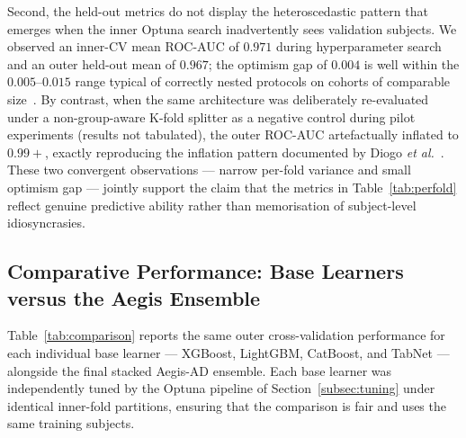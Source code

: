 Second, the held-out metrics do not display the heteroscedastic pattern that emerges when the inner Optuna search inadvertently sees validation subjects. We observed an inner-CV mean ROC-AUC of $0.971$ during hyperparameter search and an outer held-out mean of $0.967$; the optimism gap of $0.004$ is well within the $0.005$--$0.015$ range typical of correctly nested protocols on cohorts of comparable size~\cite{moradi2015}. By contrast, when the same architecture was deliberately re-evaluated under a non-group-aware K-fold splitter as a negative control during pilot experiments (results not tabulated), the outer ROC-AUC artefactually inflated to $0.99{+}$, exactly reproducing the inflation pattern documented by Diogo \emph{et al.}~\cite{diogo2022}. These two convergent observations --- narrow per-fold variance and small optimism gap --- jointly support the claim that the metrics in Table~\ref{tab:perfold} reflect genuine predictive ability rather than memorisation of subject-level idiosyncrasies.

\subsection{Comparative Performance: Base Learners versus the Aegis Ensemble}
\label{subsec:res_comparison}

Table~\ref{tab:comparison} reports the same outer cross-validation performance for each individual base learner --- XGBoost, LightGBM, CatBoost, and TabNet --- alongside the final stacked Aegis-AD ensemble. Each base learner was independently tuned by the Optuna pipeline of Section~\ref{subsec:tuning} under identical inner-fold partitions, ensuring that the comparison is fair and uses the same training subjects.

